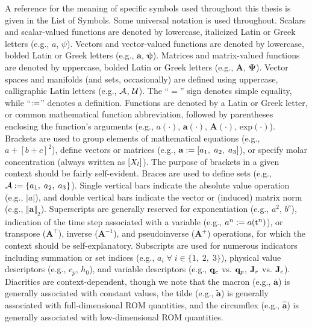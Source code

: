 A reference for the meaning of specific symbols used throughout this thesis is given in the List of Symbols. Some universal notation is used throughout. Scalars and scalar-valued functions are denoted by lowercase, italicized Latin or Greek letters (e.g., $a$, $\psi$). Vectors and vector-valued functions are denoted by lowercase, bolded Latin or Greek letters (e.g., $\mathbf{a}$, $\boldsymbol{\psi}$). Matrices and matrix-valued functions are denoted by uppercase, bolded Latin or Greek letters (e.g., $\mathbf{A}$, $\boldsymbol{\Psi}$). Vector spaces and manifolds (and sets, occasionally) are defined using uppercase, calligraphic Latin letters (e.g., $\mathcal{A}$, $\mathcal{U}$). The ``$=$'' sign denotes simple equality, while ``$:=$'' denotes a definition. Functions are denoted by a Latin or Greek letter, or common mathematical function abbreviation, followed by parentheses enclosing the function's arguments (e.g., $a(\cdot)$, $\mathbf{a}(\cdot)$, $\mathbf{A}(\cdot)$, $\text{exp}(\cdot)$). Brackets are used to group elements of mathematical equations (e.g., $a + [b + c]^2$), define vectors or matrices (e.g., $\mathbf{a} := [a_1, \; a_2, \; a_3]$), or specify molar concentration (always written as $[X_{l}]$). The purpose of brackets in a given context should be fairly self-evident. Braces are used to define sets (e.g., $\mathcal{A} := \{a_1,\; a_2,\; a_3\}$). Single vertical bars indicate the absolute value operation (e.g., $|a|$), and double vertical bars indicate the vector or (induced) matrix norm (e.g., $\Vert \mathbf{a} \Vert_2$). Superscripts are generally reserved for exponentiation (e.g., $a^2$, $b^c$), indication of the time step associated with a variable (e.g., $a^{n} := a(\text{t}^{n})$), or transpose ($\mathbf{A}^\top$), inverse ($\mathbf{A}^{-1}$), and pseudoinverse ($\mathbf{A}^+$) operations, for which the context should be self-explanatory. Subscripts are used for numerous indicators including summation or set indices (e.g., $a_{i} \; \forall \; i \in \{1,\; 2,\; 3\}$), physical value descriptors (e.g., $c_p$, $h_0$), and variable descriptors (e.g., $\mathbf{q}_{c}$ vs. $\mathbf{q}_{p}$, $\mathbf{J}_{r}$ vs. $\mathbf{J}_{c}$). Diacritics are context-dependent, though we note that the macron (e.g., $\mathbf{\overline{a}}$) is generally associated with constant values, the tilde (e.g., $\mathbf{\widetilde{a}}$) is generally associated with full-dimensional ROM quantities, and the circumflex (e.g., $\mathbf{\widehat{a}}$) is generally associated with low-dimensional ROM quantities.